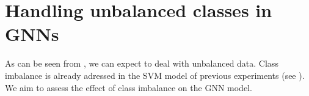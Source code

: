 \documentclass[
	fontsize=10pt, %
	twoside=false, %
	secnumdepth=1, %
  toc=indentunnumbered %
]{kaobook}
\begin{document}








\section{Handling unbalanced classes in GNNs}






As can be seen from , we can expect to deal with unbalanced
data. Class imbalance is already adressed in the SVM model of previous
experiments (see ). We aim to assess the effect of
class imbalance on the GNN model.
\end{document}
